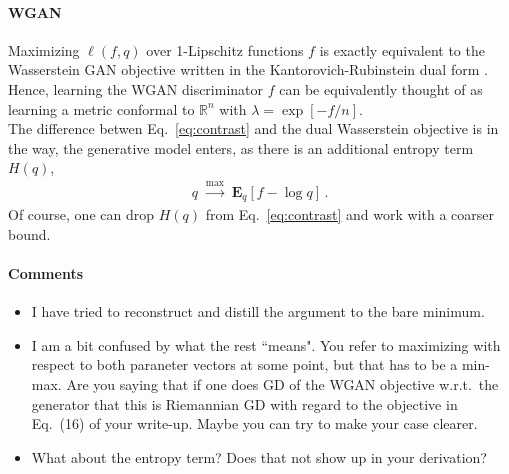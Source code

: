 \documentclass{article}
\renewcommand{\Re}{{\mathbb R}}
\newcommand{\E}{{\mathbf E}}
\begin{document}
\paragraph{WGAN} Maximizing $\ell(f,q)$  over 1-Lipschitz functions $f$ is exactly equivalent to  the Wasserstein GAN objective written in the Kantorovich-Rubinstein dual form \cite[Eq.~(2)]{arjovsky2017wasserstein}. Hence, learning the WGAN discriminator $f$ can be equivalently thought of as learning a metric conformal to $\Re^n$ with $\lambda = \exp[-f/n]$. \\

The difference betwen Eq.~\eqref{eq:contrast} and the dual Wasserstein objective is in the way, the generative model enters, as there is an additional entropy term $H(q)$,
\begin{align}
q \; \stackrel{\max}{\longrightarrow }\; \E_q \left[ f - \log q \right]\,.
\end{align}
Of course, one can drop $H(q)$  from Eq.~\eqref{eq:contrast} and work with a coarser bound. 

\paragraph{Comments}

\begin{itemize}
\item I have tried to reconstruct  and distill the argument to the bare minimum.
\item I am a bit confused by what the rest ``means". You refer to maximizing with respect to both paraneter vectors at some point, but that has to be a min-max. Are you saying that if one does GD of the WGAN objective w.r.t.~the generator that this is Riemannian GD with regard to the objective in Eq.~(16) of your write-up. Maybe you can try to make your case clearer.
\item What about the entropy term? Does that not show up in your derivation? 
\end{itemize}


\end{document}
